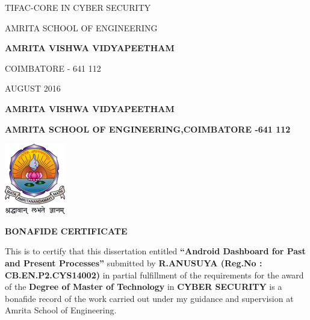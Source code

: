 \documentclass[12pt]{report}
\begin{document}
\begin{center}
	\vspace{25pt}
	\normalsize
	TIFAC-CORE IN CYBER SECURITY
	
	\vspace*{5pt}
	AMRITA SCHOOL OF ENGINEERING
	
	\vspace*{5pt}
	\large
	\textbf{AMRITA VISHWA VIDYAPEETHAM}
	
	\vspace*{5pt}
	\normalsize
	COIMBATORE - 641 112
	
	\vspace*{5pt}
	AUGUST 2016
\end{center}


\clearpage

\begin{center}
	\Large
	\textbf{AMRITA VISHWA VIDYAPEETHAM}
	
	\normalsize
	\textbf{AMRITA SCHOOL OF ENGINEERING,COIMBATORE -641 112}
	
	\vspace*{22pt}
	\includegraphics[keepaspectratio=true]{avvp_logo1}
	
	\vspace*{22pt}
	\normalsize
	\textbf{BONAFIDE CERTIFICATE}
	
\end{center}

\begin{sloppypar}
	\noindent
	This is to certify that this dissertation entitled \textbf{``Android Dashboard for Past and Present Processes''} submitted by \textbf{R.ANUSUYA (Reg.No : CB.EN.P2.CYS14002)} in partial fulfillment of the requirements for the award of the \textbf{Degree of Master of Technology} in \textbf{CYBER SECURITY} is a bonafide record of the work carried out under my guidance and supervision at Amrita School of Engineering.
\end{sloppypar}
\end{document}
